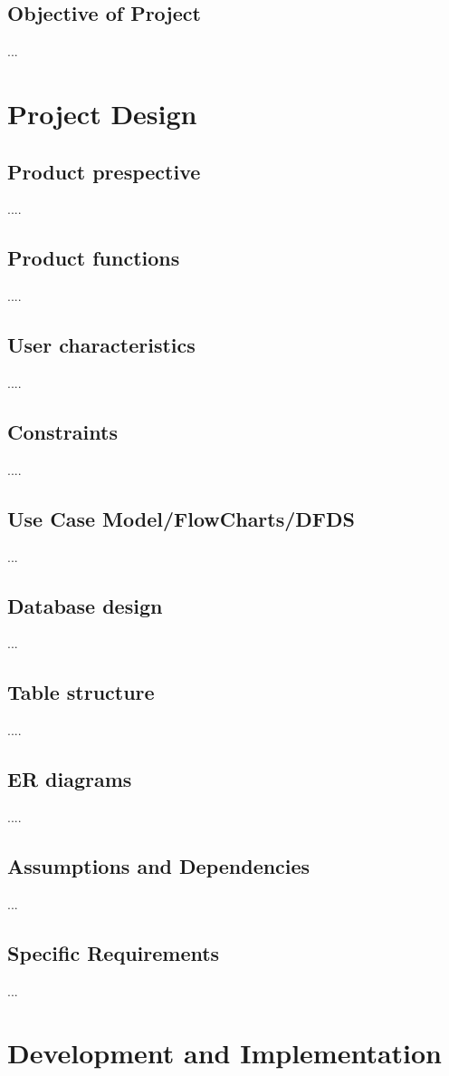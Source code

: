 \documentclass[12pt]{myclass}
\begin{document}
\subsection{Objective of Project}
...

\section{Project Design}
\subsection{Product prespective}
....
\subsection{Product functions}
....
\subsection{User characteristics}
....
\subsection{Constraints}
....
\subsection{Use Case Model/FlowCharts/DFDS}
...
\subsection{Database design}
...
\subsection{Table structure}
....
\subsection{ER diagrams}
....
\subsection{Assumptions and Dependencies}
...
\subsection{Specific Requirements}
...

\section{Development and Implementation}
\end{document}
